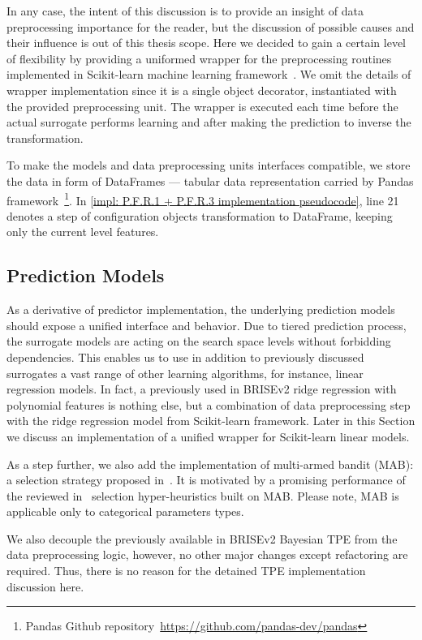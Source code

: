 In any case, the intent of this discussion is to provide an insight of data preprocessing importance for the reader, but the discussion of possible causes and their influence is out of this thesis scope. Here we decided to gain a certain level of flexibility by providing a uniformed wrapper for the preprocessing routines implemented in Scikit-learn machine learning framework~\cite{scikit-learn}. We omit the details of wrapper implementation since it is a single object decorator, instantiated with the provided preprocessing unit. The wrapper is executed each time before the actual surrogate performs learning and after making the prediction to inverse the transformation.

To make the models and data preprocessing units interfaces compatible, we store the data in form of DataFrames --- tabular data representation carried by Pandas framework~\footnote{Pandas Github repository~\url{https://github.com/pandas-dev/pandas}}. In \cref{impl: P.F.R.1 + P.F.R.3 implementation pseudocode}, line 21 denotes a step of configuration objects transformation to DataFrame, keeping only the current level features.


\subsection{Prediction Models}\label{impl: prediction models}
As a derivative of predictor implementation, the underlying prediction models should expose a unified interface and behavior. Due to tiered prediction process, the surrogate models are acting on the search space levels without forbidding dependencies. This enables us to use in addition to previously discussed surrogates a vast range of other learning algorithms, for instance, linear regression models. In fact, a previously used in BRISEv2 ridge regression with polynomial features is nothing else, but a combination of data preprocessing step with the ridge regression model from Scikit-learn framework. Later in this Section we discuss an implementation of a unified wrapper for Scikit-learn linear models.

As a step further, we also add the implementation of multi-armed bandit (MAB): a selection strategy proposed in~\cite{auer2002finite}. It is motivated by a promising performance of the reviewed in~\cite{auer2002finite} selection hyper-heuristics built on MAB. Please note, MAB is applicable only to categorical parameters types.

We also decouple the previously available in BRISEv2 Bayesian TPE from the data preprocessing logic, however, no other major changes except refactoring are required. Thus, there is no reason for the detained TPE implementation discussion here.

